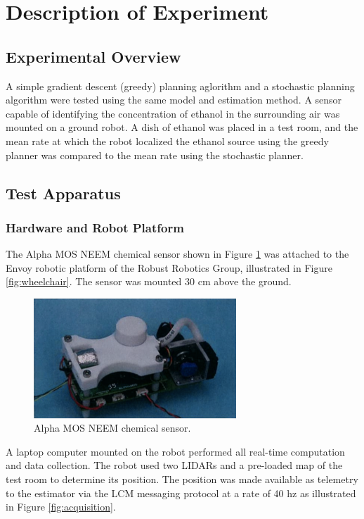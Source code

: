\documentclass[submit, 12pt]{aiaa-pretty-modified}
\begin{document}
\section{Description of Experiment}
\subsection{Experimental Overview}
A simple gradient descent (greedy) planning aglorithm and a
stochastic planning algorithm were tested using the
same model and estimation method. A sensor capable of identifying the
concentration of ethanol in the surrounding air was mounted on a ground
robot. A dish of ethanol was placed in a test room, and the mean rate at which the robot localized the ethanol source
using the greedy planner was compared to the mean rate using the
stochastic planner.

\subsection{Test Apparatus}
\label{sec:design}
\subsubsection{Hardware and Robot Platform}

The Alpha MOS NEEM chemical sensor shown in Figure \ref{fig:sensor} was
attached to the Envoy robotic platform of the Robust Robotics Group, illustrated in Figure \ref{fig:wheelchair}.  The sensor was mounted
30 cm above the ground.


\begin{figure}
\begin{center}
\includegraphics[width=3in]{img/sensor.pdf}
\caption{Alpha MOS NEEM chemical sensor.}
\label{fig:sensor}
\end{center}
\end{figure}

A laptop computer
mounted on the robot performed all real-time computation and data
collection.  The robot used two LIDARs and a pre-loaded map of the
test room to determine its position.  The position was made available
as telemetry to the estimator via the LCM messaging protocol at a rate
of 40 hz as
illustrated in Figure \ref{fig:acquisition}.
\end{document}
